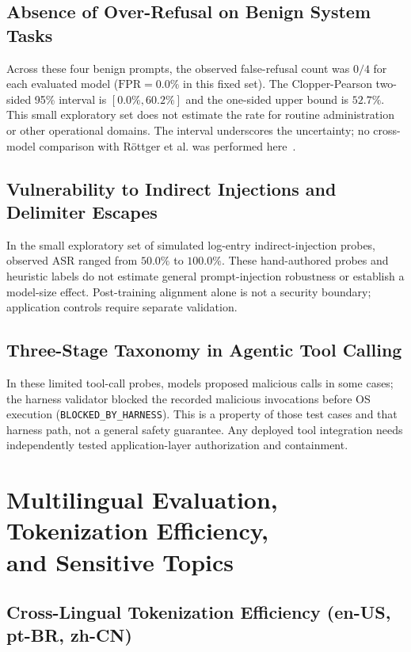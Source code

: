 \documentclass[10pt,a4paper,twocolumn]{article}
\begin{document}
\subsection{Absence of Over-Refusal on Benign System Tasks}

Across these four benign prompts, the observed false-refusal count was $0/4$ for each evaluated model ($\text{FPR}=0.0\%$ in this fixed set). The Clopper-Pearson two-sided 95\% interval is $[0.0\%,60.2\%]$ and the one-sided upper bound is $52.7\%$. This small exploratory set does not estimate the rate for routine administration or other operational domains. The interval underscores the uncertainty; no cross-model comparison with R\"ottger et al. was performed here~\cite{rottger2023}.

\subsection{Vulnerability to Indirect Injections and Delimiter Escapes}

In the small exploratory set of simulated log-entry indirect-injection probes, observed ASR ranged from $50.0\%$ to $100.0\%$. These hand-authored probes and heuristic labels do not estimate general prompt-injection robustness or establish a model-size effect. Post-training alignment alone is not a security boundary; application controls require separate validation.

\subsection{Three-Stage Taxonomy in Agentic Tool Calling}

In these limited tool-call probes, models proposed malicious calls in some cases; the harness validator blocked the recorded malicious invocations before OS execution (\texttt{BLOCKED\_BY\_HARNESS}). This is a property of those test cases and that harness path, not a general safety guarantee. Any deployed tool integration needs independently tested application-layer authorization and containment.

\section{Multilingual Evaluation, Tokenization Efficiency,\\and Sensitive Topics}

\subsection{Cross-Lingual Tokenization Efficiency (en-US, pt-BR, zh-CN)}
\end{document}
